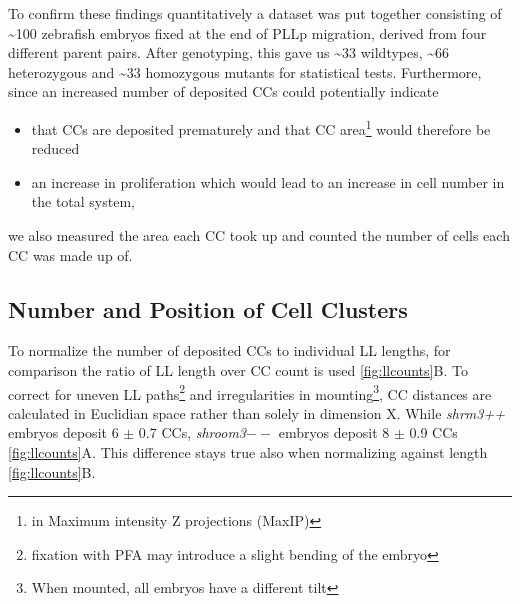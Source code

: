 \documentclass[11pt,singlespacinge,twoside]{reedthesis} %
\providecommand{\tightlist}{%
  \setlength{\itemsep}{0pt}\setlength{\parskip}{0pt}}
\begin{document}
To confirm these findings quantitatively a dataset was put together consisting of \textasciitilde{}100 zebrafish embryos fixed at the end of PLLp migration, derived from four different parent pairs. After genotyping, this gave us \textasciitilde{}33 wildtypes, \textasciitilde{}66 heterozygous and \textasciitilde{}33 homozygous mutants for statistical tests. Furthermore, since an increased number of deposited CCs could potentially indicate
\begin{itemize}
\tightlist
\item
  that CCs are deposited prematurely and that CC area\footnote{in Maximum intensity Z projections (MaxIP)} would therefore be reduced
\item
  an increase in proliferation which would lead to an increase in cell number in the total system,
\end{itemize}
we also measured the area each CC took up and counted the number of cells each CC was made up of.

\hypertarget{res-ccounts}{%
\subsection{Number and Position of Cell Clusters}\label{res-ccounts}}

To normalize the number of deposited CCs to individual LL lengths, for comparison the ratio of LL length over CC count is used \ref{fig:llcounts}B. To correct for uneven LL paths\footnote{fixation with PFA may introduce a slight bending of the embryo} and irregularities in mounting\footnote{When mounted, all embryos have a different tilt}, CC distances are calculated in Euclidian space rather than solely in dimension X. While \emph{shrm3++} embryos deposit 6 \(\pm\) 0.7 CCs, \emph{shroom3}\(--\) embryos deposit 8 \(\pm\) 0.9 CCs \ref{fig:llcounts}A. This difference stays true also when normalizing against length \ref{fig:llcounts}B.
\end{document}
